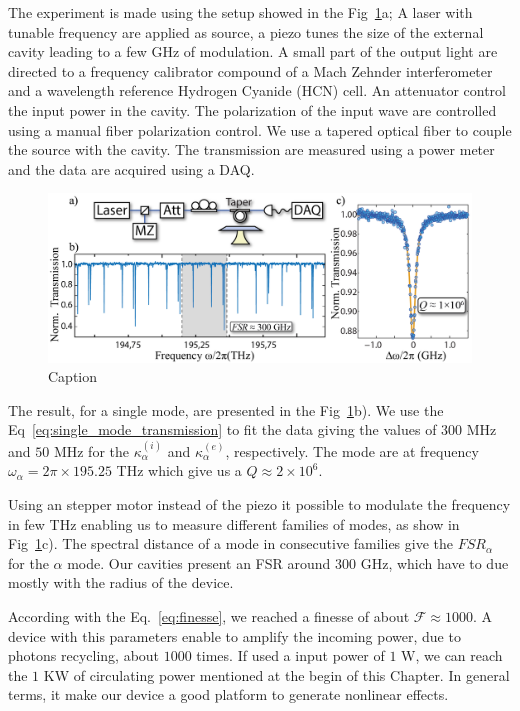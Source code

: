 The experiment is made using the setup showed in the  Fig~\ref{fig:exp_mode_charac}a; A laser with tunable frequency are applied as source, a piezo tunes the size of the external cavity leading to a few GHz of modulation. A small part of the output light are directed to a frequency calibrator compound of a Mach Zehnder interferometer and a wavelength reference Hydrogen Cyanide (HCN) cell. An attenuator control the input power in the cavity. The polarization of the input wave are controlled using a manual fiber polarization control. We use a tapered optical fiber to couple the source with the cavity. The transmission are measured using a power meter and the data are acquired using a DAQ. 
\begin{figure}[h!]
    \centering
    \includegraphics[width = 16cm]{figuras/Dissertation_optical_char_exp.jpg}
    \caption{Caption}
    \label{fig:exp_mode_charac}
\end{figure}

The result, for a single mode, are presented in the Fig~\ref{fig:exp_mode_charac}b). We use the Eq~\ref{eq:single_mode_transmission} to fit the data giving the values of $300$ MHz and $50$ MHz for the $\kappa_\alpha^{(i)}$ and $\kappa_\alpha^{(e)}$, respectively. The mode are at frequency $\omega_\alpha = 2\pi\times195.25$ THz which give us a $Q \approx 2\times10^6$.

Using an stepper motor instead of the piezo it possible to modulate the frequency in few THz enabling us to measure different families of modes, as show in Fig~\ref{fig:exp_mode_charac}c). The spectral distance of a mode in consecutive families give the $FSR_\alpha$ for the $\alpha$ mode. Our cavities present an FSR around $300$ GHz, which have to due mostly with the radius of the device. 

According with the Eq.~\ref{eq:finesse}, we reached a finesse of about $\mathcal{F} \approx 1000$. A device with this parameters enable to amplify the incoming power, due to photons recycling, about $1000$ times. If used a input power of $1$ W, we can reach the $1$ KW of circulating power mentioned at the begin of this Chapter. In general terms, it make our device a good platform to generate nonlinear effects. 


